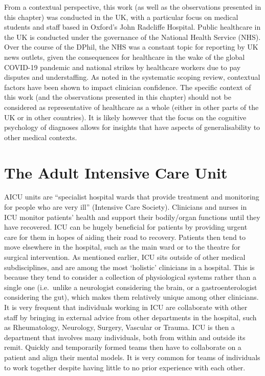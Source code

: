 \documentclass[a4paper, nobind]{templates/ociamthesis}
\begin{document}
\hfill\break
From a contextual perspective, this work (as well as the observations presented in this chapter) was conducted in the UK, with a particular focus on medical students and staff based in Oxford's John Radcliffe Hospital. Public healthcare in the UK is conducted under the governance of the National Health Service (NHS). Over the course of the DPhil, the NHS was a constant topic for reporting by UK news outlets, given the consequences for healthcare in the wake of the global COVID-19 pandemic and national strikes by healthcare workers due to pay disputes and understaffing. As noted in the systematic scoping review, contextual factors have been shown to impact clinician confidence. The specific context of this work (and the observations presented in this chapter) should not be considered as representative of healthcare as a whole (either in other parts of the UK or in other countries). It is likely however that the focus on the cognitive psychology of diagnoses allows for insights that have aspects of generalisability to other medical contexts.

\section{The Adult Intensive Care Unit}\label{the-adult-intensive-care-unit}

AICU units are ``specialist hospital wards that provide treatment and monitoring for people who are very ill'' (Intensive Care Society). Clinicians and nurses in ICU monitor patients' health and support their bodily/organ functions until they have recovered. ICU can be hugely beneficial for patients by providing urgent care for them in hopes of aiding their road to recovery. Patients then tend to move elsewhere in the hospital, such as the main ward or to the theatre for surgical intervention. As mentioned earlier, ICU sits outside of other medical subdisciplines, and are among the most `holistic' clinicians in a hospital. This is because they tend to consider a collection of physiological systems rather than a single one (i.e.~unlike a neurologist considering the brain, or a gastroenterologist considering the gut), which makes them relatively unique among other clinicians. It is very frequent that individuals working in ICU are collaborate with other staff by bringing in external advice from other departments in the hospital, such as Rheumatology, Neurology, Surgery, Vascular or Trauma. ICU is then a department that involves many individuals, both from within and outside its remit. Quickly and temporarily formed teams then have to collaborate on a patient and align their mental models. It is very common for teams of individuals to work together despite having little to no prior experience with each other.
\end{document}
